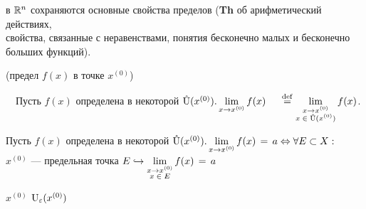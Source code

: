 \parbox[t]{0.95\linewidth}{\Note в $\R^n$ сохраняются основные свойства пределов (\textbf{Th} об арифметический действиях, \\ свойства, связанные с неравенствами, понятия бесконечно малых и бесконечно больших функций).}

\Def (предел $f(x)$ в точке $x^{(0)}$)

~~Пусть $f(x)$ определена в некоторой $\Uo(x^{(0)}). \lim\limits_{x \to x^{(0)}} f(x) \ \ \ \ \eqdef 
\lim\limits_{\substack {x \to x^{(0)} \\ x \; \in \; \Uo(x^{(0)}) }} f(x)$.


\newpage

\Th{} \parbox[t]{0.95\linewidth}{ Пусть $f(x)$ определена в некоторой $\Uo(x^{(0)}).  \lim\limits_{x \to x^{(0)}} f(x) \eq a \Leftrightarrow \forall E \subset X : $ \\
$x^{(0)}$ --- предельная точка $E \holds \lim\limits_{\substack {x \to x^{(0)} \\ x \; \in \; E }} f(x) \eq a$ }

$x^{(0)}$   $\Ue(x^{(0)})$






































 











